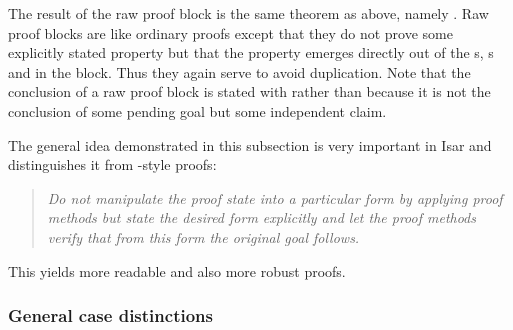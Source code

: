 \begin{isabellebody}
%
\isadelimproof
%
\endisadelimproof
%
\begin{isamarkuptext}%
\noindent The result of the raw proof block is the same theorem
as above, namely .  Raw
proof blocks are like ordinary proofs except that they do not prove
some explicitly stated property but that the property emerges directly
out of the s, s and
 in the block. Thus they again serve to avoid
duplication. Note that the conclusion of a raw proof block is stated with
 rather than  because it is not the
conclusion of some pending goal but some independent claim.

The general idea demonstrated in this subsection is very
important in Isar and distinguishes it from -style proofs:
\begin{quote}\em
Do not manipulate the proof state into a particular form by applying
proof methods but state the desired form explicitly and let the proof
methods verify that from this form the original goal follows.
\end{quote}
This yields more readable and also more robust proofs.

\subsubsection{General case distinctions}


\end{isamarkuptext}
\end{isabellebody}
